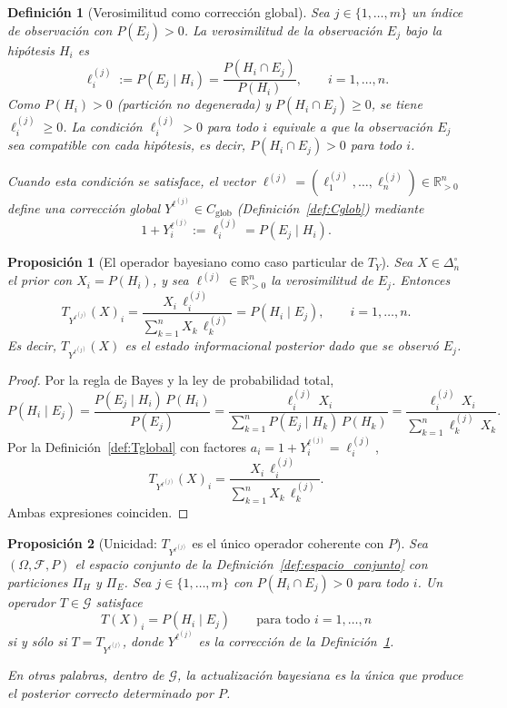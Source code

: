 ﻿\documentclass[12pt]{article}
\newtheorem{definicion}{Definición}[section]
\newtheorem{proposicion}{Proposición}[section]
\begin{document}
\begin{definicion}[Verosimilitud como corrección global]\label{def:verosimilitud}
Sea $j\in\{1,\dots,m\}$ un índice de observación con $P(E_j)>0$. La \emph{verosimilitud de la observación $E_j$ bajo la hipótesis $H_i$} es
\[
\ell_i^{(j)} := P(E_j \mid H_i) = \frac{P(H_i \cap E_j)}{P(H_i)}, \qquad i=1,\dots,n.
\]
Como $P(H_i)>0$ (partición no degenerada) y $P(H_i\cap E_j)\geq 0$, se tiene $\ell_i^{(j)}\geq 0$. La condición $\ell_i^{(j)}>0$ para todo $i$ equivale a que la observación $E_j$ sea compatible con cada hipótesis, es decir, $P(H_i\cap E_j)>0$ para todo $i$.

Cuando esta condición se satisface, el vector $\ell^{(j)} = (\ell_1^{(j)},\dots,\ell_n^{(j)})\in\mathbb{R}_{>0}^n$ define una corrección global $Y^{\ell^{(j)}}\in C_{\mathrm{glob}}$ (Definición~\ref{def:Cglob}) mediante
\[
1 + Y^{\ell^{(j)}}_i := \ell^{(j)}_i = P(E_j\mid H_i).
\]
\end{definicion}

\begin{proposicion}[El operador bayesiano como caso particular de $T_Y$]\label{prop:bayes_como_TY}
Sea $X\in\Delta_n^\circ$ el prior con $X_i=P(H_i)$, y sea $\ell^{(j)}\in\mathbb{R}_{>0}^n$ la verosimilitud de $E_j$. Entonces
\[
T_{Y^{\ell^{(j)}}}(X)_i
= \frac{X_i\,\ell^{(j)}_i}{\displaystyle\sum_{k=1}^n X_k\,\ell^{(j)}_k}
= P(H_i \mid E_j),
\qquad i=1,\dots,n.
\]
Es decir, $T_{Y^{\ell^{(j)}}}(X)$ es el estado informacional posterior dado que se observó $E_j$.
\end{proposicion}

\begin{proof}
Por la regla de Bayes y la ley de probabilidad total,
\[
P(H_i\mid E_j)
= \frac{P(E_j\mid H_i)\,P(H_i)}{P(E_j)}
= \frac{\ell^{(j)}_i\,X_i}{\displaystyle\sum_{k=1}^n P(E_j\mid H_k)\,P(H_k)}
= \frac{\ell^{(j)}_i\,X_i}{\displaystyle\sum_{k=1}^n \ell^{(j)}_k\,X_k}.
\]
Por la Definición~\ref{def:Tglobal} con factores $a_i = 1+Y^{\ell^{(j)}}_i = \ell^{(j)}_i$,
\[
T_{Y^{\ell^{(j)}}}(X)_i = \frac{X_i\,\ell^{(j)}_i}{\sum_{k=1}^n X_k\,\ell^{(j)}_k}.
\]
Ambas expresiones coinciden.
\end{proof}

\begin{proposicion}[Unicidad: $T_{Y^{\ell^{(j)}}}$ es el único operador coherente con $P$]\label{prop:unicidad_bayes}
Sea $(\Omega,\mathcal{F},P)$ el espacio conjunto de la Definición~\ref{def:espacio_conjunto} con particiones $\Pi_H$ y $\Pi_E$. Sea $j\in\{1,\dots,m\}$ con $P(H_i\cap E_j)>0$ para todo $i$. Un operador $T\in\mathcal{G}$ satisface
\[
T(X)_i = P(H_i\mid E_j) \qquad \text{para todo } i=1,\dots,n
\]
si y sólo si $T = T_{Y^{\ell^{(j)}}}$, donde $Y^{\ell^{(j)}}$ es la corrección de la Definición~\ref{def:verosimilitud}.

En otras palabras, dentro de $\mathcal{G}$, la actualización bayesiana es la única que produce el posterior correcto determinado por $P$.
\end{proposicion}
\end{document}
